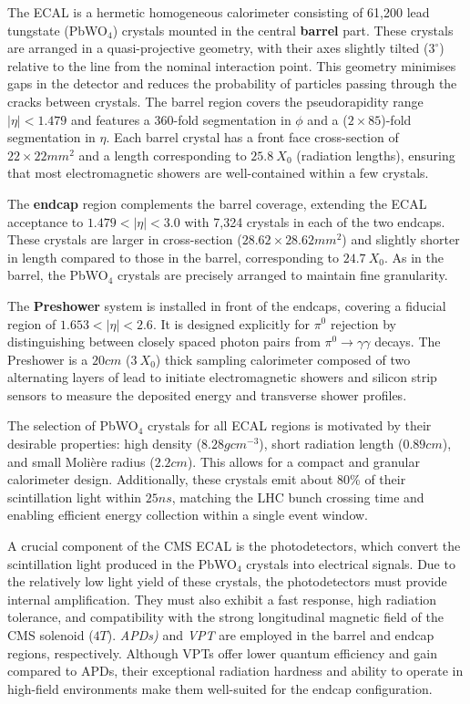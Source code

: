 The \ac{ECAL} is a hermetic homogeneous calorimeter consisting of 61,200 lead tungstate (PbWO$_4$) crystals mounted in the central \textbf{barrel} part. These crystals are arranged in a quasi-projective geometry, with their axes slightly tilted ($3^\circ$) relative to the line from the nominal interaction point. This geometry minimises gaps in the detector and reduces the probability of particles passing through the cracks between crystals. The barrel region covers the pseudorapidity range $|\eta| < 1.479$ and features a 360-fold segmentation in $\phi$ and a ($2 \times 85$)-fold segmentation in $\eta$. Each barrel crystal has a front face cross-section of $22 \times 22\unit{mm}^2$ and a length corresponding to $25.8~X_0$ (radiation lengths), ensuring that most electromagnetic showers are well-contained within a few crystals.

The \textbf{endcap} region complements the barrel coverage, extending the \ac{ECAL} acceptance to $1.479 < |\eta| < 3.0$ with 7,324 crystals in each of the two endcaps. These crystals are larger in cross-section ($28.62 \times 28.62\unit{mm}^2$) and slightly shorter in length compared to those in the barrel, corresponding to $24.7~X_0$. As in the barrel, the PbWO$_4$ crystals are precisely arranged to maintain fine granularity.

The \textbf{Preshower} system is installed in front of the endcaps, covering a fiducial region of $1.653 < |\eta| < 2.6$. It is designed explicitly for $\pi^0$ rejection by distinguishing between closely spaced photon pairs from $\pi^0 \to \gamma \gamma$ decays. The Preshower is a $20\unit{cm}$ ($3~X_0$) thick sampling calorimeter composed of two alternating layers of lead to initiate electromagnetic showers and silicon strip sensors to measure the deposited energy and transverse shower profiles.

The selection of PbWO$_4$ crystals for all \ac{ECAL} regions is motivated by their desirable properties: high density ($8.28\unit{gcm}^{-3}$), short radiation length ($0.89\unit{cm}$), and small Moli\`ere radius ($2.2\unit{cm}$). This allows for a compact and granular calorimeter design. Additionally, these crystals emit about 80\% of their scintillation light within $25\unit{ns}$, matching the \ac{LHC} bunch crossing time and enabling efficient energy collection within a single event window.

A crucial component of the \ac{CMS} \ac{ECAL} is the photodetectors, which convert the scintillation light produced in the PbWO$_4$ crystals into electrical signals. Due to the relatively low light yield of these crystals, the photodetectors must provide internal amplification. They must also exhibit a fast response, high radiation tolerance, and compatibility with the strong longitudinal magnetic field of the \ac{CMS} solenoid ($4\unit{T}$). \textit{\acp{APD})} and \textit{\ac{VPT}} are employed in the barrel and endcap regions, respectively. Although \acp{VPT} offer lower quantum efficiency and gain compared to \acp{APD}, their exceptional radiation hardness and ability to operate in high-field environments make them well-suited for the endcap configuration.

